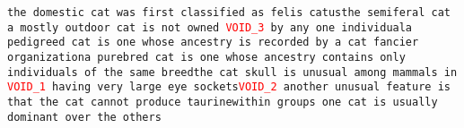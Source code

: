 \texttt{the domestic cat was first classified as felis catus\newline the semiferal cat a mostly outdoor cat is not owned \textcolor{red}{VOID\_3} by any one individual\newline a pedigreed cat is one whose ancestry is recorded by a cat fancier organization\newline a purebred cat is one whose ancestry contains only individuals of the same breed\newline the cat skull is unusual among mammals in \textcolor{red}{VOID\_1} having very large eye sockets\newline \textcolor{red}{VOID\_2} another unusual feature is that the cat cannot produce taurine\newline within groups one cat is usually dominant over the others}
